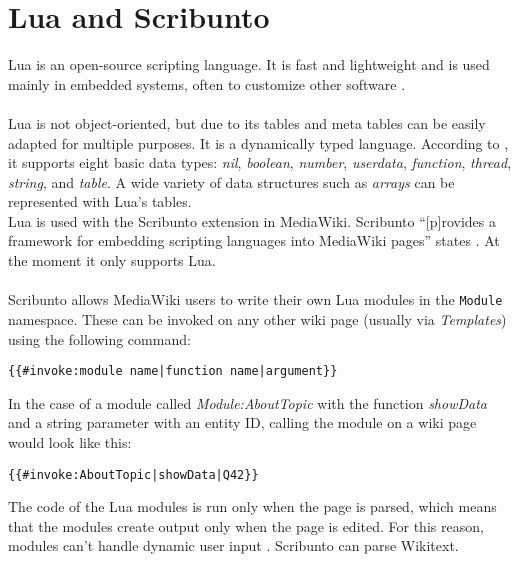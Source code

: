 \section{Lua and Scribunto}

Lua is an open-source scripting language. It is fast and lightweight and is used mainly in embedded systems, often to customize other software \citep{lua:01}. \\
\\
Lua is not object-oriented, but due to its tables and meta tables can be easily adapted for multiple purposes. It is a dynamically typed language. According to \citet[9]{luabook:01}, it supports eight basic data types: \textit{nil}, \textit{boolean}, \textit{number}, \textit{userdata}, \textit{function}, \textit{thread}, \textit{string}, and \textit{table}. A wide variety of data structures such as \textit{arrays} can be represented with Lua's tables. \\
Lua is used with the Scribunto extension in MediaWiki. Scribunto ``[p]rovides a framework for embedding scripting languages into MediaWiki pages'' states \citet{wiki:19}. At the moment it only supports Lua. \\
\\
Scribunto allows MediaWiki users to write their own Lua modules in the \texttt{\justify Module} namespace. These can be invoked on any other wiki page (usually via \textit{Templates}) using the following command:
\begin{lstlisting}[frame=single] 
{{#invoke:module name|function name|argument}}
\end{lstlisting}

In the case of a module called \textit{Module:AboutTopic} with the function \textit{showData} and a string parameter with an entity ID, calling the module on a wiki page would look like this:
\begin{lstlisting}[frame=single] 
{{#invoke:AboutTopic|showData|Q42}}
\end{lstlisting}

The code of the Lua modules is run only when the page is parsed, which means that the modules create output only when the page is edited. For this reason, modules can't handle dynamic user input \citep{wiki:20}. Scribunto can parse Wikitext.
